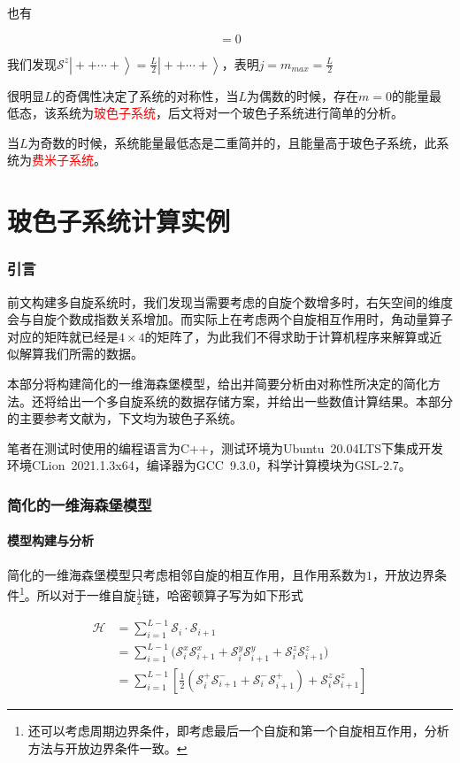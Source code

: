 \documentclass[UTF8,12pt]{article}
\providecommand\Ket[1]{\left|\right. #1 \left.\right\rangle}
\numberwithin{equation}{subsection}
\providecommand{\empR}[1]{\textcolor{red}{#1}}
\providecommand{\sumL}{\sum\limits}
\begin{document}
	也有
	\begin{snugshade}
		\begin{equation}
			[\mathcal S^2,\mathcal S^z]=0
			\label{multiSz}
		\end{equation}
	\end{snugshade}
	
	我们发现$\mathcal S^z\Ket{++\cdots+}=\frac{L}{2}\Ket{++\cdots+}$，表明$j=m_{max}=\frac{L}{2}$
	
	很明显$L$的奇偶性决定了系统的对称性，当$L$为偶数的时候，存在$m=0$的能量最低态，该系统为\empR{玻色子系统}，后文将对一个玻色子系统进行简单的分析。
	
	当$L$为奇数的时候，系统能量最低态是二重简并的，且能量高于玻色子系统，此系统为\empR{费米子系统}。
	\newpage
	\part{玻色子系统计算实例}
	\section{引言}
		前文构建多自旋系统时，我们发现当需要考虑的自旋个数增多时，右矢空间的维度会与自旋个数成指数关系增加。而实际上在考虑两个自旋相互作用时，角动量算子对应的矩阵就已经是$4\times 4$的矩阵了，为此我们不得求助于计算机程序来解算或近似解算我们所需的数据。
		
		本部分将构建简化的一维海森堡模型，给出并简要分析由对称性所决定的简化方法。还将给出一个多自旋系统的数据存储方案，并给出一些数值计算结果。本部分的主要参考文献为\parencite{Bose}，下文均为玻色子系统。
		
		笔者在测试时使用的编程语言为C++，测试环境为Ubuntu~20.04LTS下集成开发环境CLion~2021.1.3x64，编译器为GCC~9.3.0，科学计算模块为GSL-2.7。
		
		\newpage
	\section{简化的一维海森堡模型}
		\subsection{模型构建与分析}
		简化的一维海森堡模型只考虑相邻自旋的相互作用，且作用系数为$1$，开放边界条件\footnote{还可以考虑周期边界条件，即考虑最后一个自旋和第一个自旋相互作用，分析方法与开放边界条件一致。}。所以对于一维自旋$\frac{1}{2}$链，哈密顿算子写为如下形式
		\begin{snugshade}
			\begin{equation}
				\begin{aligned}
					\mathcal H &= \sumL^{L-1}_{i=1}\mathcal S_i\cdot \mathcal S_{i+1}\\
					&= \sumL^{L-1}_{i=1}\Big(\mathcal S^x_i\mathcal S^x_{i+1}+\mathcal S^y_i\mathcal S^y_{i+1}+\mathcal S^z_i\mathcal S^z_{i+1}\Big)\\
					&= \sumL^{L-1}_{i=1}\left[ \frac{1}{2}(\mathcal S^+_i\mathcal S^-_{i+1}+\mathcal S^-_i\mathcal S^+_{i+1})+\mathcal S^z_i\mathcal S^z_{i+1}\right]
				\end{aligned}
				\label{Hamiltonian}
			\end{equation}
		\end{snugshade}
		
\end{document}
